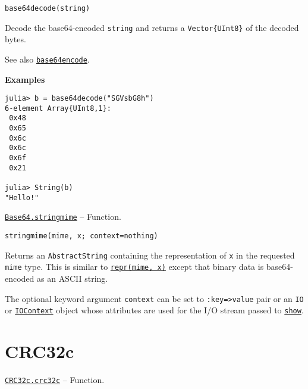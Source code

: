 \begin{adjustwidth}{2em}{0pt}


\begin{verbatim}
base64decode(string)
\end{verbatim}

Decode the base64-encoded \texttt{string} and returns a \texttt{Vector\{UInt8\}} of the decoded bytes.

See also \hyperlink{1446212874874362397}{\texttt{base64encode}}.

\textbf{Examples}


\begin{verbatim}
julia> b = base64decode("SGVsbG8h")
6-element Array{UInt8,1}:
 0x48
 0x65
 0x6c
 0x6c
 0x6f
 0x21

julia> String(b)
"Hello!"
\end{verbatim}



\end{adjustwidth}
\hypertarget{17279723834582920486}{} 
\hyperlink{17279723834582920486}{\texttt{Base64.stringmime}}  -- {Function.}

\begin{adjustwidth}{2em}{0pt}


\begin{verbatim}
stringmime(mime, x; context=nothing)
\end{verbatim}

Returns an \texttt{AbstractString} containing the representation of \texttt{x} in the requested \texttt{mime} type. This is similar to \hyperlink{13076889230390082034}{\texttt{repr(mime, x)}} except that binary data is base64-encoded as an ASCII string.

The optional keyword argument \texttt{context} can be set to \texttt{:key=>value} pair or an \texttt{IO} or \hyperlink{13454403377667762339}{\texttt{IOContext}} object whose attributes are used for the I/O stream passed to \hyperlink{3223750698971992746}{\texttt{show}}.



\end{adjustwidth}

\hypertarget{2465264826987872946}{}


\chapter{CRC32c}


\hypertarget{8058568265327059376}{} 
\hyperlink{8058568265327059376}{\texttt{CRC32c.crc32c}}  -- {Function.}

